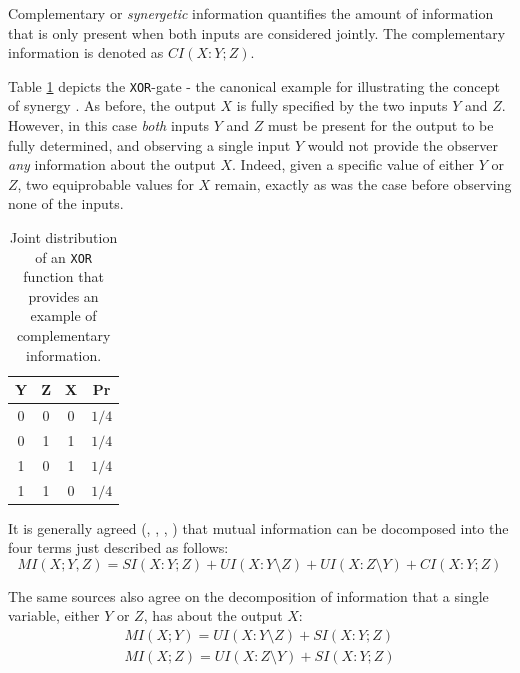 \documentclass[12pt]{article}
\begin{document}
Complementary or \textit{synergetic} information quantifies the amount of information that is only present when both inputs are considered jointly. The complementary information is denoted as $CI(X:Y;Z)$. 

Table \ref{table:3} depicts the \texttt{XOR}-gate - the canonical example for illustrating the concept of synergy \cite{pid-synergy}. As before, the output $X$ is fully specified by the two inputs $Y$ and $Z$. However, in this case \textit{both} inputs $Y$ and $Z$ must be present for the output to be fully determined, and observing a single input $Y$ would not provide the observer \textit{any} information about the output $X$. Indeed, given a specific value of either $Y$ or $Z$, two equiprobable values for $X$ remain, exactly as was the case before observing none of the inputs. 

\begin{table}[h!]
\centering
\caption{Joint distribution of an \texttt{XOR} function that provides an example of complementary information.}
\begin{tabular}{|c c |c|c|}
	\hline
	Y & Z & X & Pr\\ 
	\hline
	0 & 0 & 0 & $1/4$ \\
	0 & 1 & 1 & $1/4$ \\ 
	1 & 0 & 1 & $1/4$ \\ 
	1 & 1 & 0 & $1/4$ \\ 
	\hline
\end{tabular}
\label{table:3}
\end{table}

It is generally agreed (\cite{williams-beer}, \cite{bertschinger}, \cite{pid-redundant}, \cite{pid-synergy}) that mutual information can be docomposed into the four terms just described as follows:
\begin{equation}
MI(X;Y,Z) = SI(X:Y;Z) + UI(X:Y \setminus Z) + UI(X:Z \setminus Y) + CI(X:Y;Z)
\label{eq:pid}
\end{equation}

The same sources also agree on the decomposition of information that a single variable, either $Y$ or $Z$, has about the output $X$: 
\begin{equation}
\begin{split}
MI(X;Y) = UI(X:Y \setminus Z) + SI(X:Y;Z) \\
MI(X;Z) = UI(X:Z \setminus Y) + SI(X:Y;Z)
\label{eq:pid-yz}
\end{split}
\end{equation}
\end{document}
